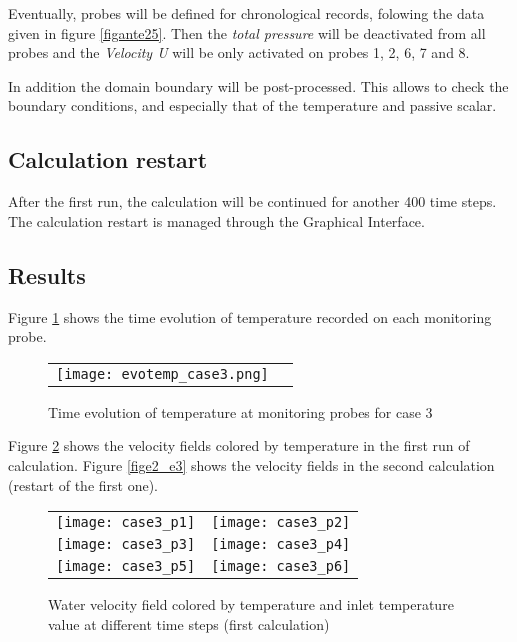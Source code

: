 Eventually, probes will be defined for chronological records, folowing the data
given in figure \ref{figante25}. Then the {\itshape total pressure} will be
deactivated from all probes and the {\itshape Velocity U} will be only activated
on probes  1, 2, 6, 7 and 8.


In addition the domain boundary will be post-processed. This allows to check the
boundary conditions, and especially that of the temperature and passive scalar.


        \subsection{Calculation restart}

After the first run, the calculation will be continued for another 400 time
steps. The calculation restart is managed through the Graphical Interface.


        \subsection{Results}
Figure \ref{fige3_e3} shows the time evolution of temperature recorded on each
monitoring probe.
\begin{figure}[hb]
\begin{center}
\begin{tabular}{cc}
\texttt{[image: evotemp\_case3.png]} \\
\end{tabular}
\caption{Time evolution of temperature at monitoring probes for case 3}
\label{fige3_e3}
\end{center}
\end{figure}

Figure \ref{fige1_e3} shows the velocity fields colored by temperature in the
first run of calculation. Figure \ref{fige2_e3} shows the velocity fields in the
second calculation (restart of the first one).

\begin{figure}
\begin{center}
\begin{tabular}{cc}
\texttt{[image: case3\_p1]} &
\texttt{[image: case3\_p2]} \\
\texttt{[image: case3\_p3]} &
\texttt{[image: case3\_p4]} \\
\texttt{[image: case3\_p5]} &
\texttt{[image: case3\_p6]} \\
\end{tabular}
\caption{Water velocity field colored by temperature and inlet temperature value
at different time steps (first calculation)}
\label{fige1_e3}
\end{center}
\end{figure}


